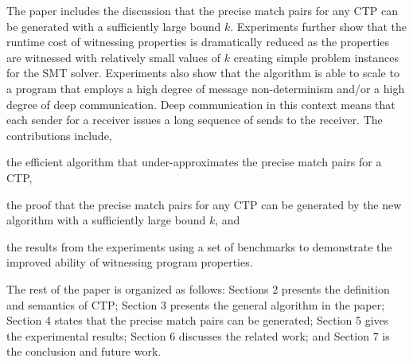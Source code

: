 

The paper includes the discussion that the precise match pairs for any CTP can be generated with a sufficiently large bound $k$. 
Experiments further show that the runtime cost of witnessing properties is dramatically reduced as the properties are witnessed with relatively small values of $k$ creating simple problem instances for the SMT solver. 
Experiments also show that the algorithm is able to scale to a program that employs a high degree of message non-determinism and/or a high degree of deep communication.
Deep communication in this context means that each sender for a receiver issues a long sequence of sends to the receiver.
The contributions include,
\begin{compactitem}
\item the efficient algorithm that under-approximates the precise match pairs for a CTP, 
\item the proof that the precise match pairs for any CTP can be generated by the new algorithm with a sufficiently large bound $k$, and
\item the results from the experiments using a set of benchmarks to demonstrate the improved ability of witnessing program properties.
\end{compactitem}

The rest of the paper is organized as follows: 
Sections 2 presents the definition and semantics of CTP; Section 3 presents the general algorithm in the paper; Section 4 states that the precise match pairs can be generated; Section 5 gives the experimental results; Section 6 discusses the related work; and Section 7 is the conclusion and future work.
